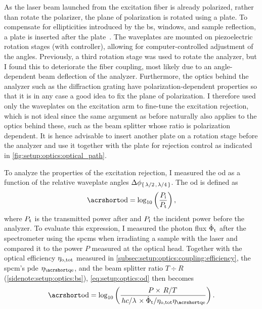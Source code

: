 As the laser beam launched from the excitation fiber is already polarized, rather than rotate the polarizer, the plane of polarization is rotated using a \halfwave plate.
To compensate for ellipticities introduced by the \gls{bs}, windows, and sample reflection, a \quarterwave plate is inserted after the \halfwave plate~\cite{Kuhlmann2013}.
The waveplates are mounted on piezoelectric rotation stages (\rotator with \rotatorcontroller controller), allowing for computer-controlled adjustment of the angles.
Previously, a third rotation stage was used to rotate the analyzer, but I found this to deteriorate the fiber coupling, most likely due to an angle-dependent beam deflection of the analyzer.
Furthermore, the optics behind the analyzer such as the diffraction grating have polarization-dependent properties so that it is in any case a good idea to fix the plane of polarization.
I therefore used only the waveplates on the excitation arm to fine-tune the excitation rejection, which is not ideal since the same argument as before naturally also applies to the optics behind these, such as the beam splitter whose ratio is polarization dependent.
It is hence advisable to insert another \halfwave plate on a rotation stage before the analyzer and use it together with the \quarterwave plate for rejection control as indicated in \cref{fig:setup:optics:optical_path}.

To analyze the properties of the excitation rejection, I measured the \gls{od} as a function of the relative waveplate angles $\Delta\phi_{\lbrace\halfwave,\quarterwave\rbrace}$.
The \gls{od} is defined as
\begin{equation}\label{eq:setup:optics:od}
    \OD = \log_{10}\left(\frac{P_{\mr{i}}}{P_{\mr{t}}}\right),
\end{equation}
where $P_{\mathrm{t}}$ is the transmitted power after and $P_{\mathrm{i}}$ the incident power before the analyzer.
To evaluate this expression, I measured the photon flux $\dot{\Phi}_{\mathrm{t}}$ after the spectrometer using the \glspl{spcm} when irradiating a sample with the laser and compared it to the power $P$ measured at the optical head.
Together with the optical efficiency $\eta_{\mathrm{o,tot}}$ measured in \cref{subsec:setup:optics:coupling:efficiency}, the \gls{spcm}'s \gls{pde} $\eta_{\QE}$, and the beam splitter ratio $T\div R$ (\cf \cref{sidenote:setup:optics:bs}), \cref{eq:setup:optics:od} then becomes
\begin{equation}\label{eq:setup:optics:od:eval}
    \OD = \log_{10}\left(\frac{P\times\flatfrac{R}{T}}{\flatfrac{hc}{\lambda}\times\dot{\Phi}_{\mr{t}}/\eta_{\mr{o,tot}}\eta_{\QE}}\right).
\end{equation}

